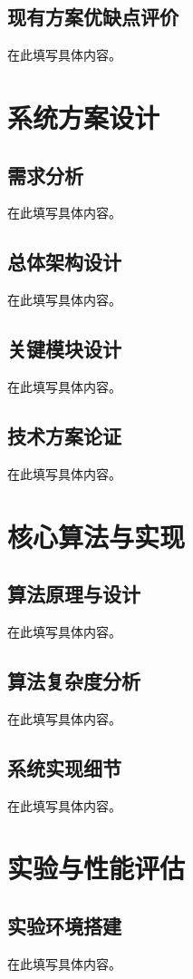 \documentclass[a4paper,12pt,openright]{ctexrep}
\begin{document}
\section{现有方案优缺点评价}
在此填写具体内容。


\chapter{系统方案设计}
\section{需求分析}
在此填写具体内容。

\section{总体架构设计}
在此填写具体内容。

\section{关键模块设计}
在此填写具体内容。

\section{技术方案论证}
在此填写具体内容。


\chapter{核心算法与实现}
\section{算法原理与设计}
在此填写具体内容。

\section{算法复杂度分析}
在此填写具体内容。

\section{系统实现细节}
在此填写具体内容。


\chapter{实验与性能评估}
\section{实验环境搭建}
在此填写具体内容。
\end{document}
